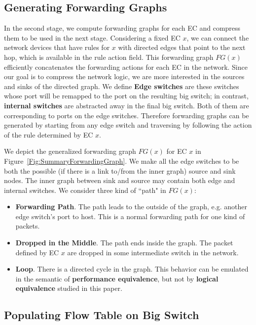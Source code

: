 \subsection{Generating Forwarding Graphs}
In the second stage, we compute forwarding graphs for each EC and compress them to be used in
the next stage.
Considering a fixed EC $x$, we can connect the network devices that have rules for $x$
with directed edges that point to the next hop, which is available in the rule action field.
This forwarding graph $FG(x)$ efficiently concatenates the forwarding actions for each EC
in the network.
Since our goal is to compress the network logic, we are more interested in the sources
and sinks of the directed graph.
We define \textbf{Edge switches} are these switches whose port will be remapped to the port on
the resulting big switch;
in contrast, \textbf{internal switches} are abstracted away in the final big switch.
Both of them are corresponding to ports on the edge switches.
Therefore forwarding graphs can be generated by starting from any edge switch and traversing
by following the action of the rule determined by EC $x$.

We depict the generalized forwarding graph $FG(x)$ for EC $x$
in Figure~\ref{Fig:SummaryForwardingGraph}.
We make all the edge switches to be both the possible
(if there is a link to/from the inner graph) source and sink nodes.
The inner graph between sink and source may contain both edge and internal switches.
We consider three kind of ``path" in $FG(x)$:
\begin{itemize}
\item \textbf{Forwarding Path}. The path leads to the outside of the graph, e.g.
        another edge switch's port to host.
        This is a normal forwarding path for one kind of packets.
\item \textbf{Dropped in the Middle}. The path ends inside the graph. The packet defined
        by EC $x$ are dropped in some intermediate switch in the network.
\item \textbf{Loop}. There is a directed cycle in the graph. This behavior can be
        emulated in the semantic of \textbf{performance equivalence}, but not by
        \textbf{logical equivalence} studied in this paper.
\end{itemize}


\subsection{Populating Flow Table on Big Switch}





